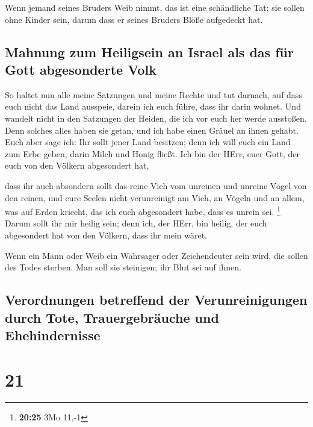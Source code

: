  Wenn jemand seines Bruders Weib nimmt, das ist eine
schändliche Tat; sie sollen ohne Kinder sein, darum dass er seines
Bruders Blöße aufgedeckt hat.

\hypertarget{mahnung-zum-heiligsein-an-israel-als-das-fuxfcr-gott-abgesonderte-volk}{%
\subsection{Mahnung zum Heiligsein an Israel als das für Gott
abgesonderte
Volk}\label{mahnung-zum-heiligsein-an-israel-als-das-fuxfcr-gott-abgesonderte-volk}}

 So haltet nun alle meine Satzungen und meine Rechte und
tut darnach, auf dass euch nicht das Land ausspeie, darein ich euch
führe, dass ihr darin wohnet.  Und wandelt nicht in den
Satzungen der Heiden, die ich vor euch her werde ausstoßen. Denn solches
alles haben sie getan, und ich habe einen Gräuel an ihnen gehabt.
 Euch aber sage ich: Ihr sollt jener Land besitzen; denn
ich will euch ein Land zum Erbe geben, darin Milch und Honig fließt. Ich
bin der HErr, euer Gott, der euch von den Völkern abgesondert hat,

 dass ihr auch absondern sollt das reine Vieh vom
unreinen und unreine Vögel von den reinen, und eure Seelen nicht
verunreinigt am Vieh, an Vögeln und an allem, was auf Erden kriecht, das
ich euch abgesondert habe, dass es unrein sei. \footnote{\textbf{20:25}
  3Mo 11,-1}  Darum sollt ihr mir heilig sein; denn ich,
der HErr, bin heilig, der euch abgesondert hat von den Völkern, dass ihr
mein wäret.

 Wenn ein Mann oder Weib ein Wahrsager oder Zeichendeuter
sein wird, die sollen des Todes sterben. Man soll sie steinigen; ihr
Blut sei auf ihnen.

\hypertarget{verordnungen-betreffend-der-verunreinigungen-durch-tote-trauergebruxe4uche-und-ehehindernisse}{%
\subsection{Verordnungen betreffend der Verunreinigungen durch Tote,
Trauergebräuche und
Ehehindernisse}\label{verordnungen-betreffend-der-verunreinigungen-durch-tote-trauergebruxe4uche-und-ehehindernisse}}

\hypertarget{section-20}{%
\section{21}\label{section-20}}

